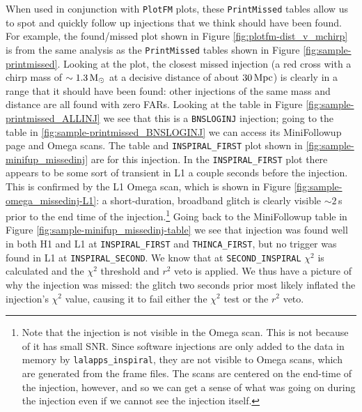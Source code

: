 When used in conjunction with \texttt{PlotFM} plots, these \texttt{PrintMissed} tables
allow us to spot and quickly follow up injections that we think should have
been found. For example, the found/missed plot shown in Figure
\ref{fig:plotfm-dist_v_mchirp} is from the same analysis as the \texttt{PrintMissed}
tables shown in Figure \ref{fig:sample-printmissed}. Looking at the plot, the
closest missed injection (a red cross with a chirp mass of $\sim1.3\,\mathrm{M_\odot}$ at
a decisive distance of about $30\,\mathrm{Mpc}$) is clearly in a range that it should
have been found: other injections of the same mass and distance are all found
with zero \acp{FAR}. Looking at the table in Figure
\ref{fig:sample-printmissed_ALLINJ} we see that this is a \verb|BNSLOGINJ|
injection; going to the table in \ref{fig:sample-printmissed_BNSLOGINJ} we can
access its MiniFollowup page and Omega scans. The table and
\verb|INSPIRAL_FIRST| plot shown in \ref{fig:sample-minifup_missedinj} are for
this injection. In the \verb|INSPIRAL_FIRST| plot there appears to be some sort
of transient in L1 a couple seconds before the injection. This is confirmed by
the L1 Omega scan, which is shown in Figure
\ref{fig:sample-omega_missedinj-L1}: a short-duration, broadband glitch is
clearly visible $\sim2\,$s prior to the end time of the
injection.\footnote{Note that the injection is not visible in the Omega scan.
This is not because of it has small \ac{SNR}. Since software injections are
only added to the data in memory by \texttt{lalapps\_inspiral}, they are not
visible to Omega scans, which are generated from the frame files. The scans are
centered on the end-time of the injection, however, and so we can get a sense
of what was going on during the injection even if we cannot see the injection
itself.} Going back to the MiniFollowup table in Figure
\ref{fig:sample-minifup_missedinj-table} we see that injection was found well
in both H1 and L1 at \verb|INSPIRAL_FIRST| and \verb|THINCA_FIRST|, but no
trigger was found in L1 at \verb|INSPIRAL_SECOND|. We know that at
\verb|SECOND_INSPIRAL| $\chi^2$ is calculated and the $\chi^2$ threshold and
$r^2$ veto is applied. We thus have a picture of why the injection was missed:
the glitch two seconds prior most likely inflated the injection's $\chi^2$
value, causing it to fail either the $\chi^2$ test or the $r^2$ veto. 

